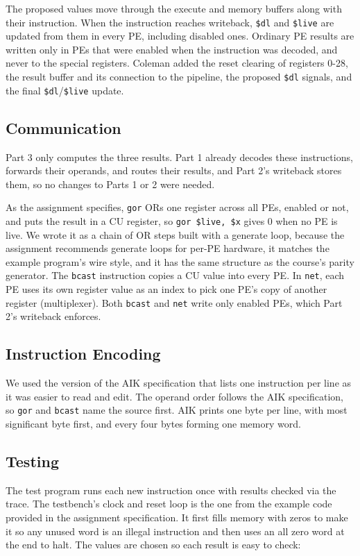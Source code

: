 \documentclass[sigconf,nonacm]{acmart}
\begin{document}
The proposed values move through the execute and memory buffers along with their instruction. When the instruction reaches writeback, \texttt{\$dl} and \texttt{\$live} are updated from them in every PE, including disabled ones. Ordinary PE results are written only in PEs that were enabled when the instruction was decoded, and never to the special registers. Coleman added the reset clearing of registers 0-28, the result buffer and its connection to the pipeline, the proposed \texttt{\$dl} signals, and the final \texttt{\$dl}/\texttt{\$live} update.

\subsection{Communication}
Part 3 only computes the three results. Part 1 already decodes these instructions, forwards their operands, and routes their results, and Part 2's writeback stores them, so no changes to Parts 1 or 2 were needed.

As the assignment specifies, \texttt{gor} ORs one register across all PEs, enabled or not, and puts the result in a CU register, so \texttt{gor \$live, \$x} gives 0 when no PE is live. We wrote it as a chain of OR steps built with a generate loop, because the assignment recommends generate loops for per-PE hardware, it matches the example program's wire style, and it has the same structure as the course's parity generator. The \texttt{bcast} instruction copies a CU value into every PE. In \texttt{net}, each PE uses its own register value as an index to pick one PE's copy of another register (multiplexer). Both \texttt{bcast} and \texttt{net} write only enabled PEs, which Part 2's writeback enforces.

\subsection{Instruction Encoding}
We used the version of the AIK specification that lists one instruction per line as it was easier to read and edit. The operand order follows the AIK specification, so \texttt{gor} and \texttt{bcast} name the source first. AIK prints one byte per line, with most significant byte first, and every four bytes forming one memory word.

\subsection{Testing}
The test program runs each new instruction once with results checked via the trace. The testbench's clock and reset loop is the one from the example code provided in the assignment specification. It first fills memory with zeros to make it so any unused word is an illegal instruction and then uses an all zero word at the end to halt. The values are chosen so each result is easy to check:
\end{document}
